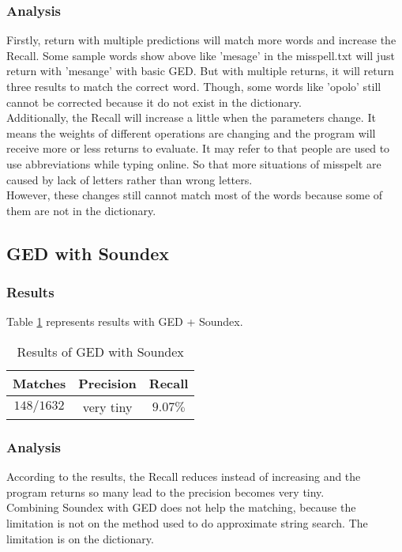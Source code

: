 \documentclass[11pt]{article}
\begin{document}
\subsubsection{Analysis}
Firstly, return with multiple predictions will match more words and increase the Recall. Some sample words show above like 'mesage' in the misspell.txt will just return with 'mesange' with basic GED. But with multiple returns, it will return three results to match the correct word.
Though, some words like 'opolo' still cannot be corrected because it do not exist in the dictionary.
\\ Additionally, the Recall will increase a little when the parameters change. It means the weights of different operations are changing and the program will receive more or less returns to evaluate.
It may refer to that people are used to use abbreviations while typing online. So that more situations of misspelt are caused by lack of letters rather than wrong letters.
\\However, these changes still cannot match most of the words because some of them are not in the dictionary.
\subsection{GED with Soundex}

\subsubsection{Results}
Table \ref{table_11} represents results with GED + Soundex.\\
\begin{table}[h]
    \begin{center}
        \begin{tabular}{|c|c|c|}
            \hline
            Matches & Precision & Recall \\ \hline
            $148/1632$ & very tiny & $9.07\%$ \\ \hline
        \end{tabular}
        \caption{Results of GED with Soundex}\label{table_11}
    \end{center}
\end{table}

\subsubsection{Analysis}
According to the results, the Recall reduces instead of increasing and the program returns so many lead to the precision becomes very tiny.
\\ Combining Soundex with GED does not help the matching, because the limitation is not on the method used to do approximate string search. The limitation is on the dictionary.
\end{document}
